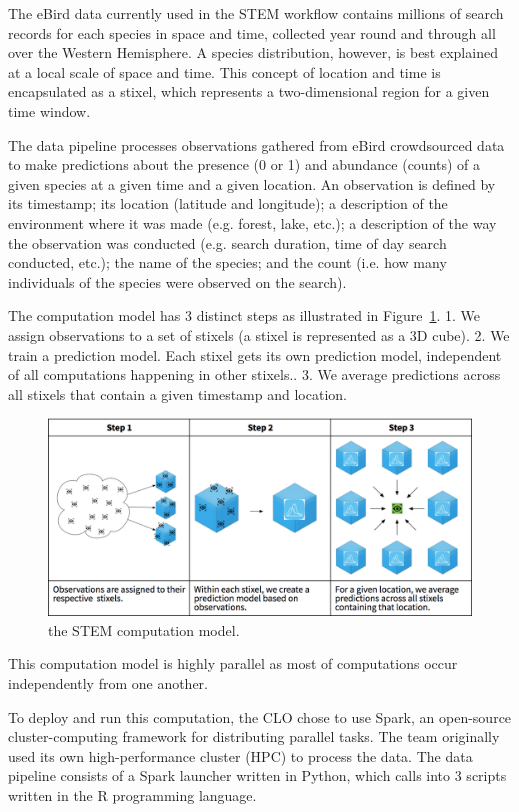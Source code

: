 \documentclass{acm_proc_article-sp}
\begin{document}
The eBird data currently used in the STEM workflow contains millions of search records for each species in space and time, collected year round and through all over the Western Hemisphere. A species distribution, however, is best explained at a local scale of space and time. This concept of location and time is encapsulated as a stixel, which represents a two-dimensional region for a given time window.

The data pipeline processes observations gathered from eBird crowdsourced data to make predictions about the presence (0 or 1) and abundance (counts) of a given species at a given time and a given location. An observation is defined by its timestamp; its location (latitude and longitude); a description of the environment where it was made (e.g. forest, lake, etc.); a description of the way the observation was conducted (e.g. search duration, time of day search conducted, etc.); the name of the species; and the count (i.e. how many individuals of the species were observed on the search).

The computation model has 3 distinct steps as illustrated in Figure~\ref{fig:computational-model}.
1. We assign observations to a set of stixels (a stixel is represented as a 3D cube).
2. We train a prediction model. Each stixel gets its own prediction model, independent of all computations happening in other stixels..  
3. We average predictions across all stixels that contain a given timestamp and location.

\begin{figure}
    \includegraphics[width=\textwidth]{IMG/stem-computational-model.png}
    \caption{the STEM computation model.}
    \label{fig:computational-model}
  \end{figure}


This computation model is highly parallel as most of computations occur independently from one another.

To deploy and run this computation, the CLO chose to use Spark, an open-source cluster-computing framework for distributing parallel tasks. The team originally used its own high-performance cluster (HPC) to process the data. The data pipeline consists of a Spark launcher written in Python, which calls into 3 scripts written in the R programming language. 
\end{document}
